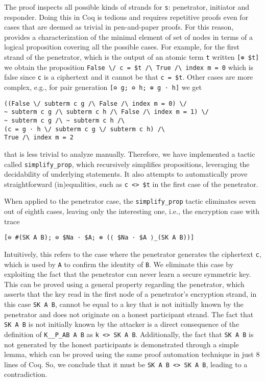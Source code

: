 The proof inspects all possible kinds of strands for \lstinline{s}: penetrator, initiator and responder.
Doing this in Coq is tedious and requires repetitive proofs even for cases that are deemed as trivial in pen-and-paper proofs.
For this reason, \easystrands{} provides a characterization of the minimal element of set of nodes in terms of a logical proposition covering all the possible cases.
For example, for the first strand of the penetrator, which is the output of an atomic term \lstinline{t} written \lstinline{[⊕ $t]} we obtain the
proposition \lstinline{False \/ c = $t /\ True /\ index m = 0}
which is false since \lstinline{c} is a ciphertext and it cannot be that \lstinline{c = $t}.
Other cases are more complex, e.g., for pair generation \lstinline{[⊖ g; ⊖ h; ⊕ g ⋅ h]} we get
\begin{lstlisting}
((False \/ subterm c g /\ False /\ index m = 0) \/
~ subterm c g /\ subterm c h /\ False /\ index m = 1) \/
~ subterm c g /\ ~ subterm c h /\
(c = g ⋅ h \/ subterm c g \/ subterm c h) /\
True /\ index m = 2
\end{lstlisting}
that is less trivial to analyze manually.
Therefore, we have implemented a tactic called \lstinline{simplify_prop}, which recursively simplifies propositions, leveraging the decidability of underlying statements.
It also attempts to automatically prove straightforward
(in)equalities, such as \lstinline{c <> $t} in the first case of the penetrator.


When applied to the penetrator case, the \lstinline{simplify_prop} tactic eliminates seven out of eighth cases, leaving only the interesting one, i.e., the encryption case with trace
\begin{lstlisting}
[⊖ #(SK A B); ⊖ $Na ⋅ $A; ⊕ (⟨ $Na ⋅ $A ⟩_(SK A B))]
\end{lstlisting}
Intuitively, this refers to the case where the penetrator generates the ciphertext \lstinline{c}, which is used by \lstinline{A} to confirm the identity of \lstinline{B}.
We eliminate this case by exploiting the fact that the penetrator can never learn a secure symmetric key.
This can be proved using a general property regarding the penetrator,
which asserts that the key read in the first node of a penetrator's encryption strand, in this case \lstinline{SK A B}, cannot be equal to a key that is not initially known by the penetrator and does not originate on a honest participant strand.
The fact that \lstinline{SK A B} is not initially known by the attacker is a direct consequence of the definition of \lstinline{K__P_AB A B} as \lstinline|k <> SK A B|. Additionally, the fact that \lstinline{SK A B} is not generated by the honest participants is demonstrated through a simple lemma, which can be proved using the same proof automation technique in just 8 lines of Coq.
So, we conclude that it must be \lstinline{SK A B <> SK A B}, leading to a contradiction.

